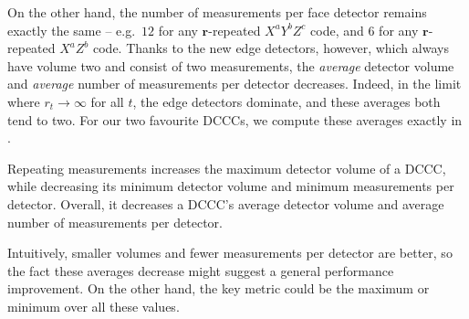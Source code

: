 On the other hand, the number of measurements per face detector remains exactly the same -- e.g.\ $12$ for any $\mathbf{r}$-repeated $X^a Y^b Z^c$ code, and 6 for any $\mathbf{r}$-repeated $X^a Z^b$ code.
Thanks to the new edge detectors, however, which always have volume two and consist of two measurements, the \emph{average} detector volume and \emph{average} number of measurements per detector decreases.
Indeed, in the limit where $r_t \to \infty$ for all $t$, the edge detectors dominate, and these averages both tend to two.
For our two favourite DCCCs, we compute these averages exactly in .

\begin{difference}\label{dif:repeating_detectors}
Repeating measurements increases the maximum detector volume of a DCCC,
while decreasing its minimum detector volume and minimum measurements per detector.
Overall, it decreases a DCCC's average detector volume and average number of measurements per detector.
\end{difference}

Intuitively, smaller volumes and fewer measurements per detector are better,
so the fact these averages decrease might suggest a general performance improvement.
On the other hand, the key metric could be the maximum or minimum over all these values.


